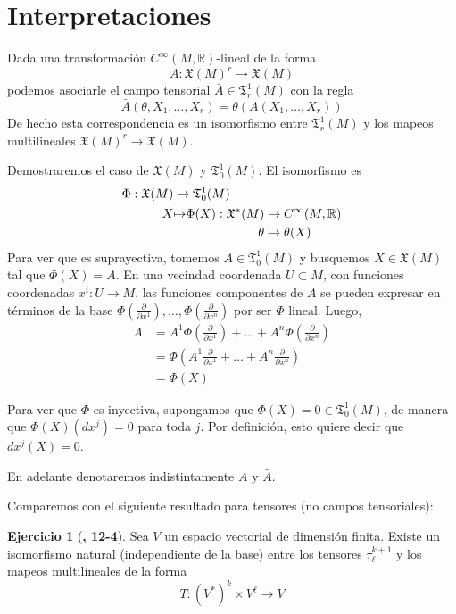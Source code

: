 \documentclass[spanish]{book}
\theoremstyle{definition}
\newtheorem*{ejer*}{Ejercicio}
\newcommand{\R}{\mathbb{R}}
\newcommand{\X}{\mathfrak{X}}
\newcommand{\T}{\mathfrak{T}}
\newcommand{\Cinf}{C^\infty}
\begin{document}
	\section{Interpretaciones}
	Dada una transformación $\Cinf(M,\R)$-lineal de la forma
	\[A:\X(M)^r\to\X(M)\]
	podemos asociarle el campo tensorial $\bar{A}\in\T^1_r(M)$ con la regla
	\[\bar{A}(\theta,X_1,\ldots,X_r)=\theta(A(X_1,\ldots,X_r))\]
	De hecho esta correspondencia es un isomorfismo entre $\T^1_r(M)$ y los mapeos multilineales $\X(M)^r\to\X(M)$.
	
	Demostraremos el caso de $\X(M)$ y $\T^1_0(M)$. El isomorfismo es
	\begin{align*}
		\Phi:\X(M)&\to\T^1_0(M)\\
		\begin{aligned}
			X\\\leavevmode
		\end{aligned}&
		\begin{aligned}
			\mapsto\\\leavevmode
		\end{aligned}
		\begin{aligned}
			\Phi(X):\X^*(M)&\to\Cinf(M,\R)\\
			\theta&\mapsto\theta(X)
		\end{aligned}
	\end{align*}
	Para ver que es suprayectiva, tomemos $A\in\T^1_0(M)$ y busquemos $X\in\X(M)$ tal que $\Phi(X)=A$. En una vecindad coordenada $U\subset M$, con funciones coordenadas $x^i:U\to M$, las funciones componentes de $A$ se pueden expresar en términos de la base $\Phi\left(\frac{\partial}{\partial x^1}\right),\ldots,\Phi\left(\frac{\partial}{\partial x^n}\right)$ por ser $\Phi$ lineal. Luego,
	\begin{align*}
		A&=A^1\Phi\left(\frac{\partial}{\partial x^1}\right)+\ldots+A^n\Phi\left(\frac{\partial}{\partial x^n}\right)\\
		&=\Phi\left(A^1\frac{\partial}{\partial x^1}+\ldots+A^n\frac{\partial}{\partial x^n}\right)\\
		&=\Phi(X)
	\end{align*}
	
	Para ver que $\Phi$ es inyectiva, supongamos que $\Phi(X)=0\in\T^1_0(M)$, de manera que $\Phi(X)(dx^j)=0$ para toda $j$. Por definición, esto quiere decir que $dx^j(X)=0$. 
	
	En adelante denotaremos indistintamente $A$ y $\bar{A}$.
	
	Comparemos con el siguiente resultado para tensores (no campos tensoriales):
	\begin{ejer*}[\cite{Lee}\textbf{, 12-4}]
		Sea $V$ un espacio vectorial de dimensión finita. Existe un isomorfismo natural (independiente de la base) entre los tensores $\tau^{k+1}_\ell$ y los mapeos multilineales de la forma
		\[T:(V^*)^k\times V^\ell\to V\]
	\end{ejer*}
\end{document}
